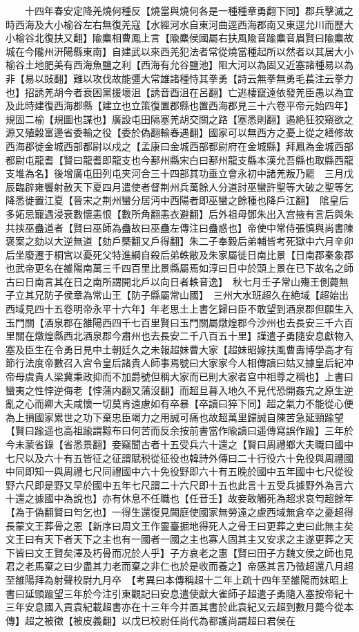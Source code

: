 　　十四年春安定降羌燒何種反【燒當與燒何各是一種種章勇翻下同】郡兵擊滅之時西海及大小榆谷左右無復羌寇【水經河水自東河曲逕西海郡南又東逕允川而歷大小榆谷北復扶又翻】隃麋相曹鳳上言【隃麋侯國屬右扶風隃音踰麋音眉賢曰隃麋故城在今隴州汧陽縣東南】自建武以來西羌犯法者常從燒當種起所以然者以其居大小榆谷土地肥美有西海魚鹽之利【西海有允谷鹽池】阻大河以為固又近塞諸種易以為非【易以䜴翻】難以攻伐故能彊大常雄諸種恃其拳勇【詩云無拳無勇毛萇注云拳力也】招誘羌胡今者衰困黨援壞沮【誘音酉沮在呂翻】亡逃棲竄遠依發羌臣愚以為宜及此時建復西海郡縣【建立也立策復置郡縣也置西海郡見三十六卷平帝元始四年】規固二榆【規圖也謀也】廣設屯田隔塞羌胡交關之路【塞悉則翻】遏絶狂狡窺欲之源又殖穀富邊省委輸之役【委於偽翻輸春遇翻】國家可以無西方之憂上從之繕修故西海郡徙金城西部都尉以戍之【孟康曰金城西部都尉府在金城縣】拜鳳為金城西部都尉屯龍耆【賢曰龍耆即龍支也今鄯州縣宋白曰鄯州龍支縣本漢允吾縣也取縣西龍支堆為名】後增廣屯田列屯夹河合三十四部其功垂立會永初中諸羌叛乃罷　三月戊辰臨辟雍饗射赦天下夏四月遣使者督荆州兵萬餘人分道討巫蠻許聖等大破之聖等乞降悉徙置江夏【晉宋之荆州蠻分居沔中西陽者即巫蠻之餘種也降戶江翻】　隂皇后多妬忌寵遇浸衰數懷恚恨【數所角翻恚衣避翻】后外祖母鄧朱出入宫掖有言后與朱共挟巫蠱道者【賢曰巫師為蠱故曰巫蠱左傳注曰蠱惑也】帝使中常侍張慎與尚書陳褒案之劾以大逆無道【劾戶槩翻又戶得翻】朱二子奉毅后弟輔皆考死獄中六月辛卯后坐廢遷于桐宫以憂死父特進綱自殺后弟軼敞及朱家屬徙日南比景【日南郡秦象郡也武帝更名在雒陽南萬三千四百里比景縣屬焉如淳曰日中於頭上景在已下故名之師古曰日南言其在日之南所謂開北戶以向日者軼音逸】　秋七月壬子常山殤王側薨無子立其兄防子侯章為常山王【防子縣屬常山國】　三州大水班超久在絶域【超始出西域見四十五卷明帝永平十六年】年老思土上書乞歸曰臣不敢望到酒泉郡但願生入玉門關【酒泉郡在雒陽西四千七百里賢曰玉門關屬燉煌郡今沙州也去長安三千六百里關在燉煌縣西北酒泉郡今肅州也去長安二千八百五十里】謹遣子勇隨安息獻物入塞及臣生在令勇日見中土朝廷久之未報超妹曹大家【超妹昭嫁扶風曹夀博學高才有節行法度帝數召入宫令皇后諸貴人師事焉號曰大家家今人相傳讀曰姑又據皇后紀冲帝母虞貴人梁冀秉政抑而不加爵號但稱大家而已則大家者宫中相尊之稱也】上書曰蠻夷之性悖逆侮老【悖蒲内翻又蒲沒翻】而超旦暮入地久不見代恐開姦宄之原生逆亂之心而卿大夫咸懷一切莫肯遠慮如有卒暴【卒讀曰猝下同】超之氣力不能從心便為上損國家累世之功下棄忠臣竭力之用誠可痛也故超萬里歸誠自陳苦急延頸踰望【賢曰踰遥也高祖踰謂黥布曰何苦而反余按前書當作隃讀曰遥傳寫誤作踰】三年於今未蒙省錄【省悉景翻】妾竊聞古者十五受兵六十還之【賢曰周禮鄉大夫職曰國中七尺以及六十有五皆征之征謂賦税從征役也韓詩外傳曰二十行役六十免役與周禮國中同即知一與周禮七尺同禮國中六十免役野即六十有五晚於國中五年國中七尺從役野六尺即是野又早於國中五年七尺謂二十六尺即十五也此言十五受兵據野外為言六十還之據國中為說也】亦有休息不任職也【任音壬】故妾敢觸死為超求哀匄超餘年【為于偽翻賢曰匄乞也】一得生還復見闕庭使國家無勞遠之慮西域無倉卒之憂超得長蒙文王葬骨之恩【新序曰周文王作靈臺掘地得死人之骨王曰更葬之吏曰此無主矣文王曰有天下者天下之主也有一國者一國之主也寡人固其主又安求之主遂更葬之天下皆曰文王賢矣澤及朽骨而况於人乎】子方哀老之惠【賢曰田子方魏文侯之師也見君之老馬棄之曰少盡其力老而棄之非仁也於是收而養之】帝感其言乃徵超還八月超至雒陽拜為射聲校尉九月卒　【考異曰本傳稱超十二年上疏十四年至雒陽而妹昭上書曰延頸踰望三年於今注引東觀記曰安息遣使獻大雀師子超遣子勇隨入塞按帝紀十三年安息國入貢袁紀載超書亦在十三年今并置其書於此袁紀又云超到數月薨今從本傳】超之被徵【被皮義翻】以戊巳校尉任尚代為都護尚謂超曰君侯在